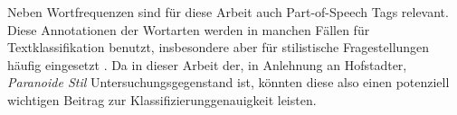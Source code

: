 Neben Wortfrequenzen sind für diese Arbeit auch Part-of-Speech Tags relevant.
Diese Annotationen der Wortarten werden in manchen Fällen für Textklassifikation benutzt, insbesondere aber für stilistische Fragestellungen häufig eingesetzt \parencite[vgl.][]{jimenez_2020}.
Da in dieser Arbeit der, in Anlehnung an Hofstadter, \textit{Paranoide Stil} Untersuchungsgegenstand ist, könnten diese also einen potenziell wichtigen Beitrag zur Klassifizierunggenauigkeit leisten.